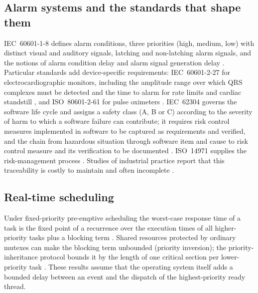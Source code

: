 \documentclass[preprint,3p,10pt]{elsarticle}
\begin{document}
\subsection{Alarm systems and the standards that shape them}
IEC~60601-1-8 defines alarm conditions, three priorities (high, medium, low) with distinct visual and auditory signals, latching and non-latching alarm signals, and the notions of alarm condition delay and alarm signal generation delay \cite{iec6060118}. Particular standards add device-specific requirements: IEC~60601-2-27 for electrocardiographic monitors, including the amplitude range over which QRS complexes must be detected and the time to alarm for rate limits and cardiac standstill \cite{iec60601227}, and ISO~80601-2-61 for pulse oximeters \cite{iso80601261,jubran2015}. IEC~62304 governs the software life cycle and assigns a safety class (A, B or C) according to the severity of harm to which a software failure can contribute; it requires risk control measures implemented in software to be captured as requirements and verified, and the chain from hazardous situation through software item and cause to risk control measure and its verification to be documented \cite{iec62304}. ISO~14971 supplies the risk-management process \cite{iso14971}. Studies of industrial practice report that this traceability is costly to maintain and often incomplete \cite{regan2013}.

\subsection{Real-time scheduling}
Under fixed-priority pre-emptive scheduling the worst-case response time of a task is the fixed point of a recurrence over the execution times of all higher-priority tasks plus a blocking term \cite{joseph1986,audsley1993,buttazzo2011}. Shared resources protected by ordinary mutexes can make the blocking term unbounded (priority inversion); the priority-inheritance protocol bounds it by the length of one critical section per lower-priority task \cite{sha1990}. These results assume that the operating system itself adds a bounded delay between an event and the dispatch of the highest-priority ready thread.
\end{document}
